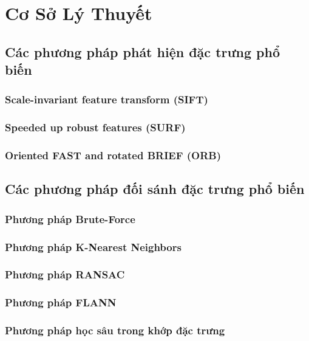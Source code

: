 \newpage
\section{Cơ Sở Lý Thuyết}
\subsection{Các phương pháp phát hiện đặc trưng phổ biến}
\subsubsection{Scale-invariant feature transform (SIFT)}
\subsubsection{Speeded up robust features (SURF)}
\subsubsection{Oriented FAST and rotated BRIEF (ORB)}
\subsection{Các phương pháp đối sánh đặc trưng phổ biến}
\subsubsection{Phương pháp Brute-Force}
\subsubsection{Phương pháp K-Nearest Neighbors}
\subsubsection{Phương pháp RANSAC}
\subsubsection{Phương pháp FLANN}
\subsubsection{Phương pháp học sâu trong khớp đặc trưng}